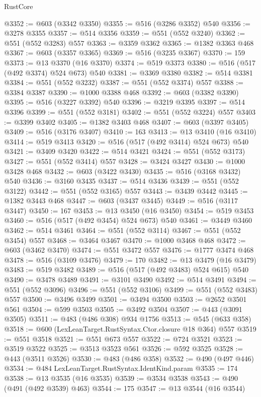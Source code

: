 \begin{lexlean}{RustCore}
\begin{coremodule}
@3352 := @603 (@3342 @3350)
@3355 := @516 (@3286 @3352) @540
@3356 := @3278 @3355
@3357 := @514 @3356
@3359 := @551 (@552 @3240)
@3362 := @551 (@552 @3283) @557
@3363 := @3359 @3362
@3365 := @1382 @3363 @468
@3367 := @603 (@3357 @3365)
@3369 := @516 (@3235 @3367)
@3370 := 159
@3373 := @13 @3370 (@16 @3370)
@3374 := @519 @3373
@3380 := @516 (@517 (@492 @3374) @524 @673) @540
@3381 := @3369 @3380
@3382 := @514 @3381
@3384 := @551 (@552 @3232)
@3387 := @551 (@552 @3374) @557
@3388 := @3384 @3387
@3390 := @1000 @3388 @468
@3392 := @603 (@3382 @3390)
@3395 := @516 (@3227 @3392) @540
@3396 := @3219 @3395
@3397 := @514 @3396
@3399 := @551 (@552 @3181)
@3402 := @551 (@552 @3224) @557
@3403 := @3399 @3402
@3405 := @1382 @3403 @468
@3407 := @603 (@3397 @3405)
@3409 := @516 (@3176 @3407)
@3410 := 163
@3413 := @13 @3410 (@16 @3410)
@3414 := @519 @3413
@3420 := @516 (@517 (@492 @3414) @524 @673) @540
@3421 := @3409 @3420
@3422 := @514 @3421
@3424 := @551 (@552 @3173)
@3427 := @551 (@552 @3414) @557
@3428 := @3424 @3427
@3430 := @1000 @3428 @468
@3432 := @603 (@3422 @3430)
@3435 := @516 (@3168 @3432) @540
@3436 := @3160 @3435
@3437 := @514 @3436
@3439 := @551 (@552 @3122)
@3442 := @551 (@552 @3165) @557
@3443 := @3439 @3442
@3445 := @1382 @3443 @468
@3447 := @603 (@3437 @3445)
@3449 := @516 (@3117 @3447)
@3450 := 167
@3453 := @13 @3450 (@16 @3450)
@3454 := @519 @3453
@3460 := @516 (@517 (@492 @3454) @524 @673) @540
@3461 := @3449 @3460
@3462 := @514 @3461
@3464 := @551 (@552 @3114)
@3467 := @551 (@552 @3454) @557
@3468 := @3464 @3467
@3470 := @1000 @3468 @468
@3472 := @603 (@3462 @3470)
@3474 := @551 @3472 @557
@3476 := @1777 @3474 @468
@3478 := @516 (@3109 @3476)
@3479 := 170
@3482 := @13 @3479 (@16 @3479)
@3483 := @519 @3482
@3489 := @516 (@517 (@492 @3483) @524 @615) @540
@3490 := @3478 @3489
@3491 := @3101 @3490
@3492 := @514 @3491
@3494 := @551 (@552 @3096)
@3496 := @551 (@552 @3106)
@3499 := @551 (@552 @3483) @557
@3500 := @3496 @3499
@3501 := @3494 @3500
@3503 := @2652 @3501 @561
@3504 := @599 @3503
@3505 := @3492 @3504
@3507 := @443 (@3091 @3505)
@3511 := @483 (@486 @308) @934 @1756
@3513 := @545 (@633 @358)
@3518 := @600 (LexLeanTarget.RustSyntax.Ctor.closure @18 @364) @557
@3519 := @551 @3518
@3521 := @551 @673 @557
@3522 := @724 @3521
@3523 := @3519 @3522
@3525 := @3513 @3523 @561
@3526 := @592 @3525
@3528 := @443 (@3511 @3526)
@3530 := @483 (@486 @358)
@3532 := @490 (@497 @446)
@3534 := @484 LexLeanTarget.RustSyntax.IdentKind.param
@3535 := 174
@3538 := @13 @3535 (@16 @3535)
@3539 := @3534 @3538
@3543 := @490 (@491 (@492 @3539) @463)
@3544 := 175
@3547 := @13 @3544 (@16 @3544)

\end{coremodule}
\end{lexlean}

